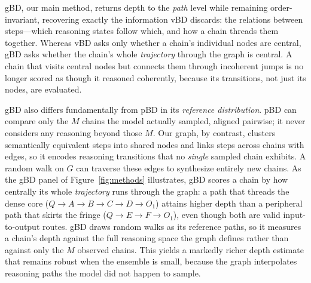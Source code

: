 \documentclass[11pt]{article}
\begin{document}
gBD, our main method, returns depth to the \emph{path} level while remaining
order-invariant, recovering exactly the information vBD discards: the relations
between steps---which reasoning states follow which, and how a chain threads them
together. Whereas vBD asks only whether a chain's individual nodes are central,
gBD asks whether the chain's whole \emph{trajectory} through the graph is central.
A chain that visits central nodes but connects them through incoherent jumps is
no longer scored as though it reasoned coherently, because its transitions, not
just its nodes, are evaluated.

gBD also differs fundamentally from pBD in its \emph{reference distribution}. pBD
can compare only the $M$ chains the model actually sampled, aligned pairwise; it
never considers any reasoning beyond those $M$. Our graph, by contrast, clusters
semantically equivalent steps into shared nodes and links steps across chains
with edges, so it encodes reasoning transitions that no \emph{single} sampled
chain exhibits. A random walk on $G$ can traverse these edges to synthesize
entirely new chains. As the gBD panel of Figure~\ref{fig:methods} illustrates,
gBD scores a chain by how centrally its whole \emph{trajectory} runs through the
graph: a path that threads the dense core ($Q \to A \to B \to C \to D \to O_1$)
attains higher depth than a peripheral path that skirts the fringe
($Q \to E \to F \to O_1$), even though both are valid input-to-output routes. gBD draws random walks as its
reference paths, so it measures a chain's depth against the full reasoning space
the graph defines rather than against only the $M$ observed chains. This yields a
markedly richer depth estimate that remains robust when the ensemble is small,
because the graph interpolates reasoning paths the model did not happen to sample.
\end{document}
